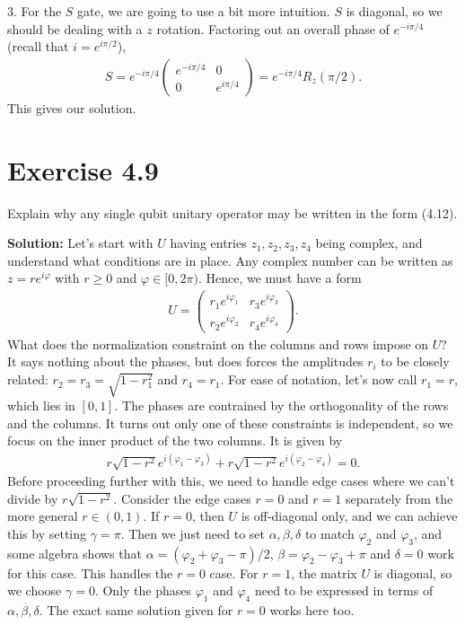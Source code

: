 \documentclass{book}
\begin{document}
    3. For the $S$ gate, we are going to use a bit more intuition. $S$ is diagonal, so we should be dealing with a $z$ rotation. Factoring out an overall phase of $e^{-i\pi/4}$ (recall that $i = e^{i\pi/2}$),
    \begin{align}
        S = e^{-i\pi/4}\begin{pmatrix}
            e^{-i\pi/4} & 0 \\
            0 & e^{i\pi/4}
        \end{pmatrix} = e^{-i\pi/4} R_z(\pi/2).
    \end{align}
    This gives our solution.
    
\section*{Exercise 4.9} 
    Explain why any single qubit unitary operator may be written in the form (4.12).
    
    \textbf{Solution:} Let's start with $U$ having entries $z_1, z_2, z_3, z_4$ being complex, and understand what conditions are in place. Any complex number can be written as $z = re^{i\varphi}$ with $r\geq 0$ and $\varphi \in [0,2\pi)$. Hence, we must have a form
    \begin{align}
        U = \begin{pmatrix}
            r_1 e^{i\varphi_1} & r_3 e^{i\varphi_3} \\
            r_2 e^{i\varphi_2} & r_4 e^{i\varphi_4}
        \end{pmatrix}.
    \end{align}
    What does the normalization constraint on the columns and rows impose on $U$? It says nothing about the phases, but does forces the amplitudes $r_i$ to be closely related: $r_2 = r_3 = \sqrt{1-r_1^2}$ and $r_4 = r_1$. For ease of notation, let's now call $r_1 = r$, which lies in $[0,1]$. The phases are contrained by the orthogonality of the rows and the columns. It turns out only one of these constraints is independent, so we focus on the inner product of the two columns. It is given by
    \begin{align} \label{eq:U_inn_prod}
        r\sqrt{1-r^2} e^{i(\varphi_1-\varphi_3)} + r\sqrt{1-r^2} e^{i(\varphi_2-\varphi_4)} = 0.
    \end{align}
    Before proceeding further with this, we need to handle edge cases where we can't divide by $r\sqrt{1-r^2}$. Consider the edge cases $r=0$ and $r=1$ separately from the more general $r \in (0,1)$. If $r=0$, then $U$ is off-diagonal only, and we can achieve this by setting $\gamma = \pi$. Then we just need to set $\alpha, \beta, \delta$ to match $\varphi_2$ and $\varphi_3$, and some algebra shows that $\alpha = (\varphi_2 + \varphi_3 -\pi)/2$, $\beta = \varphi_2 - \varphi_3 + \pi$ and $\delta = 0$ work for this case. This handles the $r = 0$ case. For $r = 1$, the matrix $U$ is diagonal, so we choose $\gamma = 0$. Only the phases $\varphi_1$ and $\varphi_4$ need to be expressed in terms of $\alpha, \beta, \delta$. The exact same solution given for $r = 0$ works here too. 
    
\end{document}
